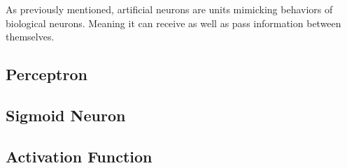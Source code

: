 As previously mentioned, artificial neurons are units mimicking behaviors of biological neurons. Meaning it can receive as well as pass information between themselves.

\subsection{Perceptron}

\subsection{Sigmoid Neuron}

\subsection{Activation Function}

